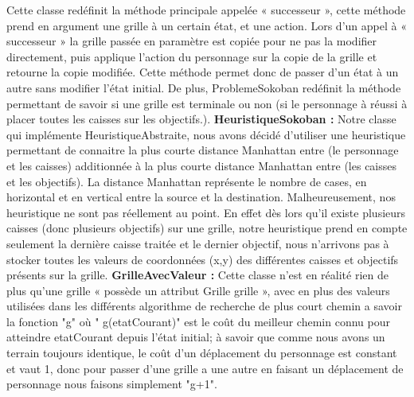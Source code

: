 \documentclass[a4paper,12pt]{article} %
\begin{document}
\newline\newline
Cette classe redéfinit la méthode principale appelée « successeur », cette méthode prend en argument une grille à un certain état, et une action. 
\newline\newline
Lors d’un appel à « successeur » la grille passée en paramètre est copiée pour ne pas la modifier directement, puis applique l’action du personnage sur la copie de la grille et retourne la copie modifiée. Cette méthode permet donc de passer d’un état à un autre sans modifier l’état initial.
\newline 
De plus, ProblemeSokoban redéfinit la méthode permettant de savoir si une grille est terminale ou non (si le personnage à réussi à placer toutes les caisses sur les objectifs.).
\newline\newline
\noindent
\textbf{HeuristiqueSokoban :}
\newline\newline
Notre classe qui implémente HeuristiqueAbstraite, nous avons décidé d’utiliser une heuristique permettant de connaitre la plus courte distance Manhattan entre (le personnage et les caisses) additionnée à la plus courte distance Manhattan entre (les caisses et les objectifs). 
\newline\newline
La distance Manhattan représente le nombre de cases, en horizontal et en vertical entre la source et la destination. 
\newline
Malheureusement, nos heuristique ne sont pas réellement au point. 
\newline\newline
En effet dès lors qu’il existe plusieurs caisses (donc plusieurs objectifs) sur une grille, notre heuristique prend en compte seulement la dernière caisse traitée et le dernier objectif, nous n’arrivons pas à stocker toutes les valeurs de coordonnées (x,y) des différentes caisses et objectifs présents sur la grille.
\newpage 
\noindent
\textbf{GrilleAvecValeur :}
\newline\newline
Cette classe n’est en réalité rien de plus qu’une grille « possède un attribut Grille grille », avec en plus des valeurs utilisées dans les différents algorithme de recherche de plus court chemin a savoir la fonction "g" où " g(etatCourant)" est le coût du meilleur chemin connu pour atteindre etatCourant depuis l'état initial; à savoir que comme nous avons un terrain toujours identique, le coût d’un déplacement du personnage est constant et vaut 1, donc pour passer d’une grille a une autre en faisant un déplacement de personnage nous faisons simplement "g+1". 
\end{document}
